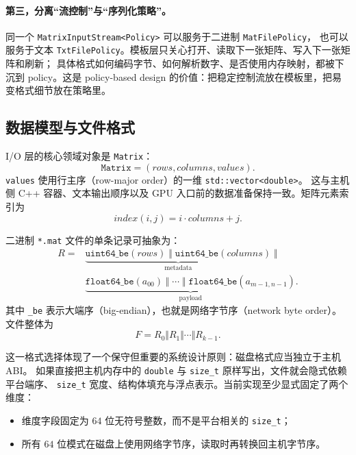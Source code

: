 \paragraph{第三，分离“流控制”与“序列化策略”。}
同一个 \texttt{MatrixInputStream<Policy>} 可以服务于二进制 \texttt{MatFilePolicy}，
也可以服务于文本 \texttt{TxtFilePolicy}。模板层只关心打开、读取下一张矩阵、写入下一张矩阵和刷新；
具体格式如何编码字节、如何解析数字、是否使用内存映射，都被下沉到 policy。这是 policy-based design
的价值：把稳定控制流放在模板里，把易变格式细节放在策略里。

\subsection{数据模型与文件格式}

I/O 层的核心领域对象是 \texttt{Matrix}：
\[
    \texttt{Matrix}=(rows,columns,values).
\]
\texttt{values} 使用行主序（row-major order）的一维 \texttt{std::vector<double>}。
这与主机侧 C++ 容器、文本输出顺序以及 GPU 入口前的数据准备保持一致。矩阵元素索引为
\[
    index(i,j)=i\cdot columns+j.
\]

二进制 \texttt{*.mat} 文件的单条记录可抽象为：
\[
    \begin{aligned}
        R ={} &
        \underbrace{
            \texttt{uint64\_be}(rows)\;\Vert\;\texttt{uint64\_be}(columns)
        }_{\text{metadata}}
        \;\Vert                                                         \\
              & \underbrace{
                    \texttt{float64\_be}(a_{00})\;\Vert\;\cdots\;\Vert\;
                    \texttt{float64\_be}(a_{m-1,n-1})
                }_{\text{payload}} .
    \end{aligned}
\]
其中 \texttt{\_be} 表示大端序（big-endian），也就是网络字节序（network byte order）。
文件整体为
\[
    F=R_0\Vert R_1\Vert\cdots\Vert R_{k-1}.
\]

这一格式选择体现了一个保守但重要的系统设计原则：磁盘格式应当独立于主机 ABI。
如果直接把主机内存中的 \texttt{double} 与 \texttt{size\_t} 原样写出，文件就会隐式依赖平台端序、
\texttt{size\_t} 宽度、结构体填充与浮点表示。当前实现至少显式固定了两个维度：

\begin{itemize}
    \item 维度字段固定为 $64$ 位无符号整数，而不是平台相关的 \texttt{size\_t}；
    \item 所有 $64$ 位模式在磁盘上使用网络字节序，读取时再转换回主机字节序。
\end{itemize}

